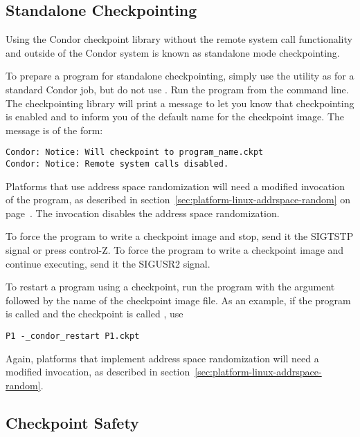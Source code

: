 \subsection{\label{sec:standalone-ckpt}Standalone Checkpointing}

Using the Condor checkpoint library without the remote system call
functionality and outside of the Condor system is known as standalone
mode checkpointing.

To prepare a program for standalone checkpointing, simply use the
 utility as for a standard Condor job, 
but do not use .
Run the program from the command line.
The checkpointing library will print a message to let you know
that checkpointing is enabled and to inform you of the default
name for the checkpoint image.
The message is of the form:

\footnotesize
\begin{verbatim}
Condor: Notice: Will checkpoint to program_name.ckpt
Condor: Notice: Remote system calls disabled.
\end{verbatim}
\normalsize

Platforms that use address space randomization will need
a modified invocation of the program,
as described in section~\ref{sec:platform-linux-addrspace-random} on
page~\pageref{sec:platform-linux-addrspace-random}.
The invocation disables the address space randomization.
 
To force the program to write a checkpoint image and stop, send it
the SIGTSTP signal or press control-Z.  To force the program to 
write a checkpoint image and continue executing, send it the
SIGUSR2 signal.

To restart a program using a checkpoint, run the program
with the argument
 followed by the name of the checkpoint
image file.
As an example, if the program is called  and
the checkpoint is called , use
\begin{verbatim}
P1 -_condor_restart P1.ckpt
\end{verbatim}
Again, platforms that implement address space randomization will
need a modified invocation,
as described in section~\ref{sec:platform-linux-addrspace-random}.

\subsection{\label{sec:ckpt-safety}Checkpoint Safety}

